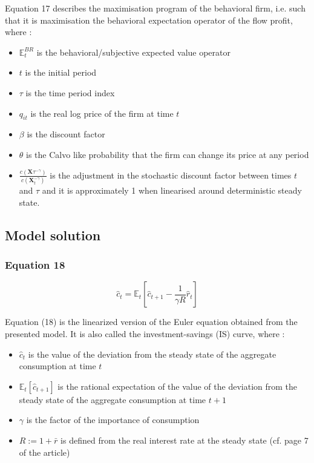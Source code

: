 \documentclass{article}
\begin{document}
Equation 17 describes the maximisation program of the behavioral firm, i.e. such that it is maximisation the behavioral expectation operator of the flow profit, where : 
\begin{itemize}
    \item $\mathbb{E}_{t}^{BR}$ is the behavioral/subjective expected value operator 
    \item $t$ is the initial period 
    \item $\tau$ is the time period index  
    \item $q_{it}$ is the real log price of the firm at time $t$
    \item $\beta$ is the discount factor
    \item $\theta$ is the Calvo like probability that the firm can change its price at any period
    \item $\frac{c\left(\bm{X}{\tau}^{-\gamma}\right)}{c\left(\bm{X}_{t}^{-\gamma}\right)}$ is the adjustment in the stochastic discount factor between times $t$ and $\tau$ and it is approximately 1 when linearised around deterministic steady state. 
\end{itemize}

\subsection{Model solution}

\subsubsection*{Equation 18}
\begin{equation}\tag{18}
    \hat{c}_{t}=\mathbb{E}_{t}\left[\hat{c}_{t+1}-\frac{1}{\gamma R}\hat{r}_{t}\right]
\end{equation}

Equation (18) is the linearized version of the Euler equation obtained from the presented model. It is also called the investment-savings (IS) curve, where : 
\begin{itemize}
    \item $\hat{c}_{t}$ is the value of the deviation from the steady state of the aggregate consumption at time $t$
    \item $\mathbb{E}_{t}\left[\hat{c}_{t+1}\right]$ is the rational expectation of the value of the deviation from the steady state of the aggregate consumption at time $t+1$
    \item $\gamma$ is the factor of the importance of consumption
    \item $R:=1+\bar{r}$ is defined from the real interest rate at the steady state (cf. page 7 of the article)
\end{itemize}
\end{document}
